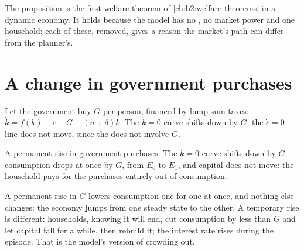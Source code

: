 The proposition is the first welfare theorem of \cref{ch:b2:welfare-theorems} in a dynamic economy. It holds because the model has no
, no market power and one household; each of these, removed, gives a reason the market's path can differ from
the planner's.

\section{A change in government purchases}\label{sec:b2:ramsey-model:government}

Let the government buy $G$ per person, financed by lump-sum taxes: $\dot k = f(k) - c - G - (n + \delta)k$. The $\dot k = 0$ curve shifts down by $G$; the $\dot c = 0$ line does not move, since the 
does not involve $G$.

\begin{omfigure}

{\small A permanent rise in government purchases. The $\dot k = 0$ curve shifts down by $G$; consumption drops at once by $G$, from $E_0$ to $E_1$, and capital does not move:
the household pays for the purchases entirely out of consumption.}
\end{omfigure}

A permanent rise in $G$ lowers consumption one for one at once, and nothing else changes: the economy jumps from one steady state
to the other. A temporary rise is different: households, knowing it will end, cut consumption by less than $G$ and let capital fall
for a while, then rebuild it; the interest rate rises during the episode. That is the model's version of crowding out.

